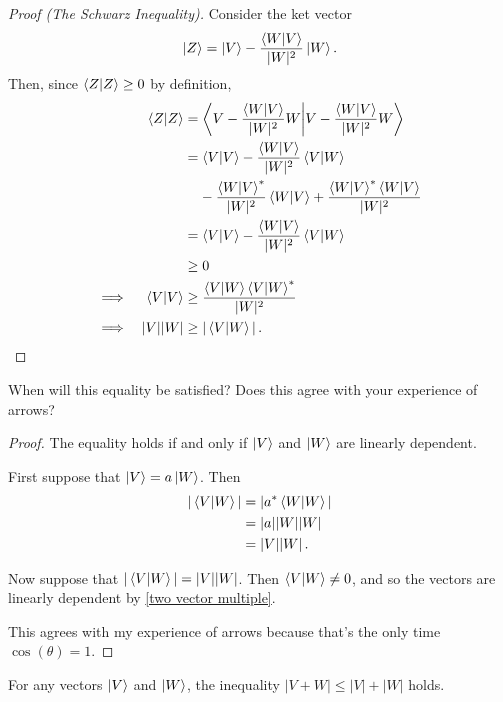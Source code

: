\begin{proof}[Proof (The Schwarz Inequality)]
Consider the ket vector
\begin{equation}
    \ket{Z} = \ket{V} - \frac{\braket{W}{V}}{|W|^2}\ket{W}.
\end{equation}
Then, since $\braket{Z} \geq 0$ by definition,
\begin{alignat}{3}
    &&\braket{Z}{Z} &= \braket{V - \frac{\braket{W}{V}}{|W|^2}W}{V - \frac{\braket{W}{V}}{|W|^2}W} \\
    &&&= \braket{V} - \frac{\braket{W}{V}}{|W|^2}\braket{V}{W} \\
    &&&\hphantom{M}- \frac{\braket{W}{V}^*}{|W|^2}\braket{W}{V} + \frac{\braket{W}{V}^*\braket{W}{V}}{|W|^2} \\
    &&&= \braket{V} - \frac{\braket{W}{V}}{|W|^2}\braket{V}{W} \\
    &&&\geq 0 \\
    \implies& &\braket{V} &\geq \frac{\braket{V}{W} \braket{V}{W}^*}{|W|^2} \\
    \implies& &|V||W| &\geq |\braket{V}{W}|\,.
\end{alignat}
\end{proof}

\begin{exercise}
When will this equality be satisfied? Does this agree with your experience of arrows?
\end{exercise}

\begin{proof}
The equality holds if and only if $\ket{V}$ and $\ket{W}$ are linearly dependent.

First suppose that $\ket{V} = a\ket{W}$. Then
\begin{align}
    |\braket{V}{W}| &= |a^*\braket{W}| \\
    &= |a||W||W| \\
    &= |V||W|\,.
\end{align}

Now suppose that $|\braket{V}{W}| = |V||W|$. Then $\braket{V}{W} \neq 0$, and so the vectors are linearly dependent by \eqref{two vector multiple}.

This agrees with my experience of arrows because that's the only time $\cos{(\theta)} = 1$.
\end{proof}

\begin{theorem}\label{triangle inequality}
For any vectors $\ket{V}$ and $\ket{W}$, the inequality $|V + W| \leq |V| + |W|$ holds.
\end{theorem}

